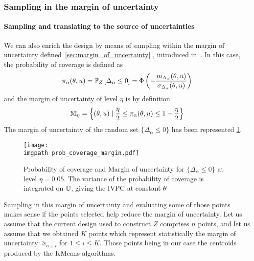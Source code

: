 \documentclass[../../Main_ManuscritThese.tex]{subfiles}
\newcommand\imgpath{/home/victor/acadwriting/Manuscrit/Text/Chapter4/img/}
\begin{document}
\subsubsection{Sampling in the margin of uncertainty}
\paragraph{Sampling and translating to the source of uncertainties}
We can also enrich the design by means of sampling within the margin
of uncertainty defined~\cref{sec:margin_of_uncertainty}
, introduced
in~\cite{echard_ak-mcs_2011,schobi_rare_2017,razaaly_rare_2019}. %
In this case, the probability of coverage is defined as
\begin{equation}
  \pi_{\alpha}(\theta, u) = \mathbb{P}_{Z}\left[\Delta_{\alpha} \leq 0\right] = \Phi\left(-\frac{m_{\Delta_\alpha}(\theta, u)}{\sigma_{\Delta_\alpha}(\theta, u)}\right)
\end{equation}
and the margin of uncertainty of level $\eta$ is by definition
\begin{equation}
  \mathbb{M}_{\eta} = \left\{ (\theta, u) \mid \frac{\eta}{2} \leq \pi_{\alpha}(\theta, u) \leq 1 - \frac{\eta}{2}\right\}
\end{equation}
The margin of uncertainty of the random set $\{\Delta_{\alpha} \leq 0\}$ has been represented \cref{fig:prob_coverage_margin}.
\begin{figure}[ht]
  \centering
  \texttt{[image: \\imgpath prob\_coverage\_margin.pdf]}
  \caption[Probability of coverage and margin of uncertainty]{\label{fig:prob_coverage_margin} Probability of coverage
    and Margin of uncertainty for $\{\Delta_{\alpha} \leq 0\}$ at
    level $\eta=0.05$. The variance of the probability of coverage is
    integrated on $\mathbb{U}$, giving the IVPC at constant $\theta$}
\end{figure}

Sampling in this margin of uncertainty and evaluating some of those
points makes sense if the points selected help reduce the margin of
uncertainty.  Let us assume that the current design used to construct
$Z$ comprises $n$ points, and let us assume that we obtained $K$
points which represent statistically the margin of uncertainty:
$\tilde{x}_{n+i}$ for $1\leq i\leq K$. Those points being in our case
the centroids produced by the KMeans algorithms.
\end{document}
